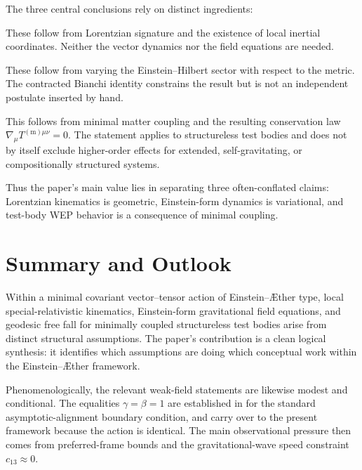 \documentclass[12pt,a4paper]{article}
\newcommand{\AEther}{\AE{}ther}
\begin{document}
        The three central conclusions rely on distinct ingredients:
        
        \begin{description}[leftmargin=2.2em, labelsep=0.8em]
            \item[Local SR kinematics.]
            These follow from Lorentzian signature and the existence of local inertial
            coordinates. Neither the vector dynamics nor the field equations are needed.
            
            \item[Einstein-form field equations.]
            These follow from varying the Einstein--Hilbert sector with respect to the
            metric. The contracted Bianchi identity constrains the result but is not an
            independent postulate inserted by hand.
            
            \item[Geodesic free fall in the test-body limit.]
            This follows from minimal matter coupling and the resulting conservation law
            $\nabla_\mu T^{(\mathrm m)\mu\nu}=0$. The statement applies to structureless
            test bodies and does not by itself exclude higher-order effects for extended,
            self-gravitating, or compositionally structured systems.
        \end{description}
        
        Thus the paper's main value lies in separating three often-conflated claims:
        Lorentzian kinematics is geometric, Einstein-form dynamics is variational, and
        test-body WEP behavior is a consequence of minimal coupling.
    
    \section{Summary and Outlook}
        \label{sec:summary}
        
        Within a minimal covariant vector--tensor action of Einstein--\AEther{} type,
        local special-relativistic kinematics, Einstein-form gravitational field
        equations, and geodesic free fall for minimally coupled structureless test
        bodies arise from distinct structural assumptions. The paper's contribution is a
        clean logical synthesis: it identifies which assumptions are doing which
        conceptual work within the Einstein--\AEther{} framework.

        Phenomenologically, the relevant weak-field statements are likewise modest and
        conditional. The equalities $\gamma=\beta=1$ are established in
        \cite{foster2006} for the standard asymptotic-alignment boundary condition, and
        carry over to the present framework because the action is identical. The main
        observational pressure then comes from preferred-frame bounds and the
        gravitational-wave speed constraint $c_{13}\approx 0$.
        
\end{document}
